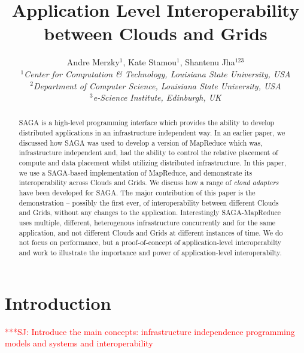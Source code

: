 \documentclass[conference,final]{IEEEtran}
\title{Application Level Interoperability between Clouds and Grids}
\author{Andre Merzky$^{1}$,  Kate Stamou$^{1}$, Shantenu Jha$^{123}$\\
  \small{\emph{$^{1}$Center for Computation \& Technology, Louisiana
      State University, USA}}\\
  \small{\emph{$^{2}$Department of Computer Science, Louisiana State
      University, USA}}\\
  \small{\emph{$^{3}$e-Science Institute, Edinburgh, UK}}\\
}
\newcommand{\jhanote}[1]{ {\textcolor{red} { ***SJ: #1 }}}
\newcommand{\jhanote}[1]{}
\newcommand{\sagamapreduce }{SAGA-MapReduce }
\begin{document}
\maketitle

\begin{abstract}
  SAGA is a high-level programming interface which provides the
  ability to develop distributed applications in an infrastructure
  independent way. In an earlier paper, we discussed how SAGA was used
  to develop a version of MapReduce which was, infrastructure
  independent and, had the ability to control the relative placement
  of compute and data placement whilst utilizing distributed
  infrastructure. In this paper, we use a SAGA-based implementation of
  MapReduce, and demonstrate its interoperability across Clouds and
  Grids.  We discuss how a range of {\it cloud adapters} have been
  developed for SAGA.  The major contribution of this paper is the
  demonstration -- possibly the first ever, of interoperability
  between different Clouds and Grids, without any changes to the
  application. Interestingly \sagamapreduce uses multiple, different,
  heterogenous infrastructure concurrently and for the same
  application, and not different Clouds and Grids at different
  instances of time.  We do not focus on performance, but a
  proof-of-concept of application-level interoperabilty and work to
  illustrate the importance and power of application-level
  interoperabilty.
\end{abstract}

\section{Introduction} 

\jhanote{Introduce the main concepts: infrastructure independence
  programming models and systems and interoperability}

\end{document}
